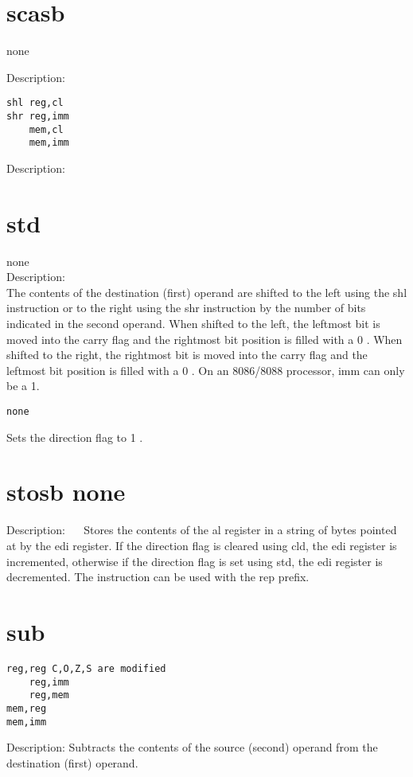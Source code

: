 \documentclass[10pt]{article}
\begin{document}
\section*{scasb}
none

Description:

\begin{verbatim}
shl reg,cl
shr reg,imm
    mem,cl
    mem,imm
\end{verbatim}

Description:

\section*{std}
none\\
Description:\\
The contents of the destination (first) operand are shifted to the left using the shl instruction or to the right using the shr instruction by the number of bits indicated in the second operand. When shifted to the left, the leftmost bit is moved into the carry flag and the rightmost bit position is filled with a 0 . When shifted to the right, the rightmost bit is moved into the carry flag and the leftmost bit position is filled with a 0 . On an 8086/8088 processor, imm can only be a 1.

\begin{verbatim}
none
\end{verbatim}

Sets the direction flag to 1 .

\section*{stosb none}
Description: $\quad$ Stores the contents of the al register in a string of bytes pointed at by the edi register. If the direction flag is cleared using cld, the edi register is incremented, otherwise if the direction flag is set using std, the edi register is decremented. The instruction can be used with the rep prefix.

\section*{sub}
\begin{verbatim}
reg,reg C,O,Z,S are modified
    reg,imm
    reg,mem
mem,reg
mem,imm
\end{verbatim}

Description: Subtracts the contents of the source (second) operand from the destination (first) operand.
\end{document}

